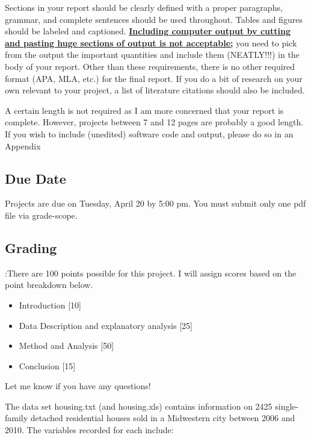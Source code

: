\documentclass[]{article}
\begin{document}
Sections in your report should be clearly defined with a proper paragraphs,  grammar, and complete sentences should be used throughout. Tables and figures should be labeled and captioned. \textbf{\underline{Including computer output by cutting and pasting huge sections of output is not acceptable;}} you need to pick from the output the important quantities and include them (NEATLY!!!) in the body of your report. Other than these requirements, there is no other required format (APA, MLA, etc.) for the final report. If you do a bit of research on your own relevant to your project, a list of literature citations should also be included.
	

A certain length is not required as I am more concerned that your report is complete. However, projects between 7 and 12 pages are probably a good length. If you wish to include (unedited) software code and output, please do so in an Appendix
	

\subsection{Due Date}


Projects are due on Tuesday, April 20 by 5:00 pm. You must submit only one pdf file via grade-scope. 

\subsection{Grading}:There are 100 points possible for this project. I will assign scores based on the point breakdown below.
\begin{itemize}
	\item Introduction [10]
	\item Data Description and explanatory analysis [25]
	\item Method and Analysis [50]
	\item Conclusion [15]
	\end{itemize}
Let me know if you have any questions!
\newpage

The data set housing.txt (and housing.xls) contains information on 2425 single-family detached residential houses sold in a Midwestern city between 2006 and 2010. The variables recorded for each include:
\end{document}
